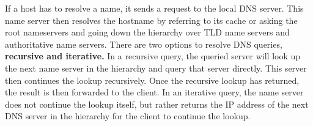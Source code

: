 If a host has to resolve a name, it sends a request to the local DNS server. This name server then resolves the hostname by referring to its cache or asking the root nameservers and going down the hierarchy over TLD name servers and authoritative name servers. There are two options to resolve DNS queries, \textbf{recursive and iterative.} In a recursive query, the queried server will look up the next name server in the hierarchy and query that server directly. This server then continues the lookup recursively. Once the recursive lookup has returned, the result is then forwarded to the client. In an iterative query, the name server does not continue the lookup itself, but rather returns the IP address of the next DNS server in the hierarchy for the client to continue the lookup.\vspace{.3cm}\\

